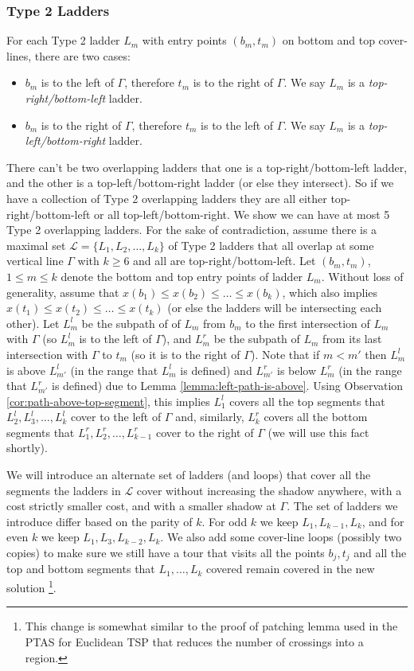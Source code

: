 \documentclass[pdflatex,sn-mathphys-num]{sn-jnl}
\theoremstyle{thmstyleone}
\begin{document}
    \subsubsection*{Type 2 Ladders}
    For each Type 2 ladder $L_m$ with entry points $(b_m, t_m)$ on bottom and top cover-lines, there are two cases:
    \begin{itemize}
        \item $b_m$ is to the left of $\Gamma$, therefore $t_m$ is to the right of $\Gamma$. We say $L_m$ is a {\em top-right/bottom-left} ladder.
        
        \item $b_m$ is to the right of $\Gamma$, therefore $t_m$ is to the left of $\Gamma$. We say $L_m$ is a {\em top-left/bottom-right} ladder.
    \end{itemize}
    There can't be two overlapping ladders that one is a top-right/bottom-left ladder, and the other is a top-left/bottom-right ladder (or else they intersect). So if we have a collection of Type 2 overlapping ladders they are all either top-right/bottom-left or all top-left/bottom-right. We show we can have at most 5 Type 2 overlapping ladders.
    For the sake of contradiction, assume there is a maximal set $\mathcal L = \{L_1, L_2, \dots, L_k\}$ of Type 2 ladders that all overlap at some vertical line $\Gamma$ with $k\ge 6$ and all are top-right/bottom-left. 
    Let $(b_m, t_m)$, $1\leq m\leq k$ denote the bottom and top entry points of ladder $L_m$. Without loss of generality, assume that $x(b_1) \le x(b_2) \le \dots \le x(b_k)$, which also implies $x(t_1) \le x(t_2) \le \dots \le x(t_k)$ (or else the ladders will be intersecting each other). Let $L^l_m$ be the subpath of of $L_m$ from $b_m$ to the first intersection of $L_m$ with $\Gamma$ (so $L^l_m$ is to the left of $\Gamma$), and $L^r_m$ be the subpath of $L_m$ from its last intersection with $\Gamma$ to $t_m$ (so it is to the right of $\Gamma$).
    Note that if $m<m'$ then $L^l_m$ is above $L^l_{m'}$ (in the range that $L^l_m$ is defined) and $L^r_{m'}$ is below $L^r_{m}$ (in the range that $L^r_{m'}$ is defined) due to Lemma \ref{lemma:left-path-is-above}.
    Using Observation \ref{cor:path-above-top-segment}, this implies $L^l_1$ covers all the top segments that $L^l_2, L^l_3,\dots, L^l_k$ cover to the left of $\Gamma$ and, similarly, $L^r_k$ covers all the bottom segments that $L^r_1, L^r_2,\dots, L^r_{k-1}$ cover to the right of $\Gamma$ (we will use this fact shortly).

    We will introduce an alternate set of ladders (and loops) that cover all the segments the ladders in $\mathcal L$ cover without increasing the shadow anywhere, with a cost strictly smaller cost, and with a smaller shadow at $\Gamma$. The set of ladders we introduce differ based on the parity of $k$. For odd $k$ we keep $L_1,L_{k-1},L_k$, and for even $k$ we keep $L_1,L_3,L_{k-2},L_k$. We also add some cover-line loops (possibly two 
    copies) to make sure we still have a tour that visits all the points $b_j,t_j$ and 
    all the top and bottom segments that $L_1,\ldots,L_k$ covered remain covered in the new solution
    \footnote{This change is somewhat similar to the proof of patching lemma used in the PTAS for Euclidean TSP
    that reduces the number of crossings into a region.}.
\end{document}
